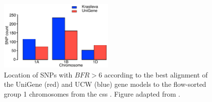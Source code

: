 \begin{figure}
  \centering
    \includegraphics[width=0.5\textwidth]{Yr15/Figures/mapping/snpsBFR6Group1.pdf}
  \caption[Location of SNPs with BFR\textgreater6.]{Location of SNPs with $BFR>6$ according to the best alignment of the UniGene (red) and UCW (blue) gene models to the flow-sorted group 1 chromosomes from the \gls{css} \citep{Mayer2014}. Figure adapted from \citet{Ramirez-Gonzalez2015b}.} 
  \label{fig:yr15:snpsBFR6Group1}
\end{figure}



